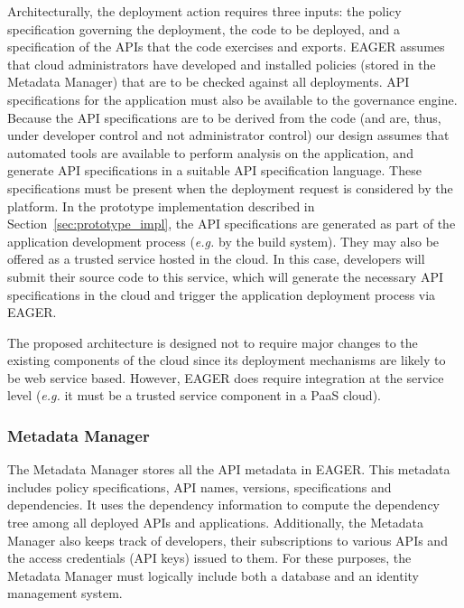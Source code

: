 Architecturally, the deployment action requires three inputs: the policy
specification governing the deployment, the code to be deployed, and a
specification of the APIs that the code exercises and exports.
EAGER assumes that cloud administrators have developed and installed policies
(stored in the Metadata Manager)
that are to be checked against all deployments.  API specifications for the
application must also be available to the governance engine.  Because the API
specifications are to be derived from the code (and are, thus, under developer
control and not administrator control) our design assumes that automated
tools are available
to perform analysis on the application, and
generate API specifications in a suitable API specification language. These
specifications must be present
when the deployment request is considered by the platform.  In the prototype
implementation described in Section~\ref{sec:prototype_impl}, the API specifications are
generated as part of the application development process ({\em e.g.} by the
build system).  They may also
be offered as a trusted service hosted in the cloud. 
In this case, developers will submit their source code
to this service, which will generate the necessary API specifications in the cloud and trigger
the application deployment process via EAGER.

The proposed architecture is designed not to require major changes to the 
existing components of the cloud since its deployment mechanisms are likely to
be web service based.  However, EAGER does require integration at the service level
({\em e.g.} it must be a trusted service component in a PaaS cloud). 

\subsubsection{Metadata Manager}
The Metadata Manager stores all the API metadata in EAGER. This metadata 
includes policy specifications,  API names, versions, specifications and 
dependencies.
It uses the dependency information to compute the dependency tree 
among 
all deployed APIs and applications. Additionally, the Metadata Manager
also keeps track of developers, their subscriptions to various APIs and the access credentials (API keys) issued to them. 
For these purposes,
the Metadata Manager must logically include both a database
and an identity management system.

